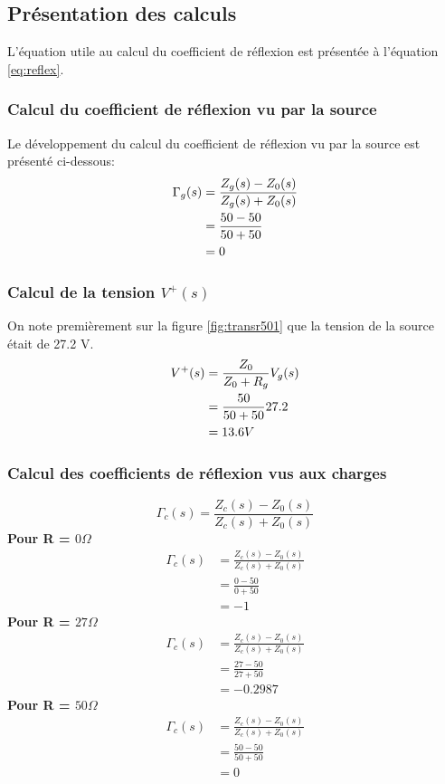 \subsection{Présentation des calculs}
L'équation utile au calcul du coefficient de réflexion est présentée à l'équation \ref{eq:reflex}. 
\subsubsection*{Calcul du coefficient de réflexion vu par la source}
Le développement du calcul du coefficient de réflexion vu par la source est présenté ci-dessous:
\begin{align}
\Gamma_g (s) &= \frac{Z_g(s) - Z_0(s)}{Z_g(s) + Z_0(s)}\\
		 &= \frac{50 - 50 }{50 + 50}\notag\\
		 &= 0\notag
\end{align}
\subsubsection*{Calcul de la tension $V^{+}(s)$}
On note premièrement sur la figure \ref{fig:transr501} que la tension de la source était de 27.2 V.
\begin{align}
V^{+}(s) &=  \frac{Z_0}{Z_0 + R_g} V_g (s)\\
		 &=	 \frac{50}{50 + 50} 27.2 \notag\\
		 &=  13.6V\notag
\end{align}

\subsubsection*{Calcul des coefficients de réflexion vus aux charges}
\begin{equation}
\Gamma_c (s) = \frac{Z_c(s) - Z_0(s)}{Z_c(s) + Z_0(s)}
\end{equation}
\textbf{Pour R = $0\Omega$}
\begin{align*}
\Gamma_c (s) &= \frac{Z_c(s) - Z_0(s)}{Z_c(s) + Z_0(s)}\\
			 &= \frac{0 - 50 }{0 + 50}\\
			 &= -1
\end{align*}
\textbf{Pour R = $27\Omega$}
\begin{align*}
\Gamma_c (s) &= \frac{Z_c(s) - Z_0(s)}{Z_c(s) + Z_0(s)}\\
			 &= \frac{27 - 50 }{27 + 50}\\
			 &= -0.2987
\end{align*}
\textbf{Pour R = $50\Omega$}
\begin{align*}
\Gamma_c (s) &= \frac{Z_c(s) - Z_0(s)}{Z_c(s) + Z_0(s)}\\
			 &= \frac{50 - 50 }{50 + 50}\\
			 &= 0
\end{align*}

